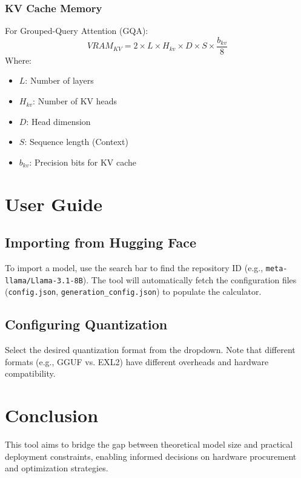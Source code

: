 \documentclass[11pt,a4paper]{article}
\begin{document}
\subsubsection{KV Cache Memory}
For Grouped-Query Attention (GQA):
\begin{equation}
    VRAM_{KV} = 2 \times L \times H_{kv} \times D \times S \times \frac{b_{kv}}{8}
\end{equation}
Where:
\begin{itemize}
    \item $L$: Number of layers
    \item $H_{kv}$: Number of KV heads
    \item $D$: Head dimension
    \item $S$: Sequence length (Context)
    \item $b_{kv}$: Precision bits for KV cache
\end{itemize}

\section{User Guide}
\subsection{Importing from Hugging Face}
To import a model, use the search bar to find the repository ID (e.g., \texttt{meta-llama/Llama-3.1-8B}). The tool will automatically fetch the configuration files (\texttt{config.json}, \texttt{generation\_config.json}) to populate the calculator.

\subsection{Configuring Quantization}
Select the desired quantization format from the dropdown. Note that different formats (e.g., GGUF vs. EXL2) have different overheads and hardware compatibility.

\section{Conclusion}
This tool aims to bridge the gap between theoretical model size and practical deployment constraints, enabling informed decisions on hardware procurement and optimization strategies.
\end{document}
